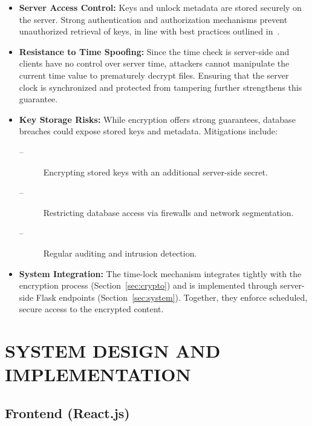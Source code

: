 \documentclass[12pt]{article}
\begin{document}
\begin{itemize}
    \item \textbf{Server Access Control:}
    Keys and unlock metadata are stored securely on the server. Strong authentication and authorization mechanisms prevent unauthorized retrieval of keys, in line with best practices outlined in~\cite{nist80038a}.
\end{itemize}

\begin{itemize}
    \item \textbf{Resistance to Time Spoofing:}
    Since the time check is server-side and clients have no control over server time, attackers cannot manipulate the current time value to prematurely decrypt files. Ensuring that the server clock is synchronized and protected from tampering further strengthens this guarantee.
\end{itemize}

\begin{itemize}
    \item \textbf{Key Storage Risks:}
    While encryption offers strong guarantees, database breaches could expose stored keys and metadata. Mitigations include:
    \begin{description}
        \item[--] Encrypting stored keys with an additional server-side secret.
        \item[--] Restricting database access via firewalls and network segmentation.
        \item[--] Regular auditing and intrusion detection.
    \end{description}
\end{itemize}


\begin{itemize}
    \item \textbf{System Integration:}
    The time-lock mechanism integrates tightly with the encryption process (Section~\ref{sec:crypto}) and is implemented through server-side Flask endpoints (Section~\ref{sec:system}). Together, they enforce scheduled, secure access to the encrypted content.
\end{itemize}

\section{SYSTEM DESIGN AND IMPLEMENTATION}

\subsection{Frontend (React.js)}
\end{document}
